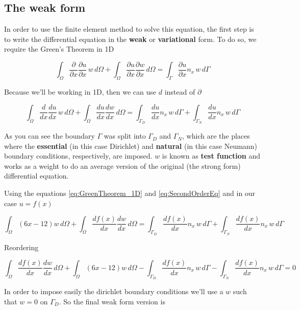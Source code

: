 \documentclass[letterpaper,10pt]{article}
\begin{document}
\subsection{The weak form}

In order to use the finite element method to solve this equation, the first step is to write the differential equation in the \textbf{weak} or \textbf{variational} form. To do so, we require the Green's Theorem in 1D

\[
\int_{\Omega} \frac{\partial}{\partial x} \frac{\partial u}{\partial x} \, w \, d\Omega + \int_{\Omega} \frac{\partial u}{\partial x} \frac{\partial w}{\partial x} \, d\Omega = \int_{\Gamma} \frac{\partial u}{\partial x} n_x \, w \, d\Gamma
\]

Because we'll be working in 1D, then we can use $d$ instead of $\partial$

\begin{equation}
\int_{\Omega} \frac{d}{d x} \frac{d u}{d x} \, w \, d\Omega + \int_{\Omega} \frac{d u}{d x} \frac{d w}{d x} \, d\Omega = \int_{\Gamma_D} \frac{d u}{d x} n_x \, w \, d\Gamma + \int_{\Gamma_N} \frac{d u}{d x} n_x \, w \, d\Gamma
\label{eq:GreenTheorem_1D}
\end{equation}

As you can see the boundary $\Gamma$ was split into $\Gamma_D$ and $\Gamma_N$, which are the places where the \textbf{essential} (in this case Dirichlet) and \textbf{natural} (in this case Neumann) boundary conditions, respectively, are imposed. $w$ is known as \textbf{test function} and works as a weight to do an average version of the original (the strong form) differential equation.

Using the equations \ref{eq:GreenTheorem_1D} and \ref{eq:SecondOrderEq} and in our case $u = f(x)$

\[
\int_{\Omega} (6x-12) w \, d\Omega + \int_{\Omega} \frac{d f(x)}{d x} \frac{d w}{d x} \, d\Omega = \int_{\Gamma_D} \frac{d f(x)}{d x} n_x \, w \, d\Gamma + \int_{\Gamma_N} \frac{d f(x)}{d x} n_x \, w \, d\Gamma
\]

Reordering

\[
\int_{\Omega} \frac{d f(x)}{d x} \frac{d w}{d x} \, d\Omega + \int_{\Omega} (6x-12) w \, d\Omega - \int_{\Gamma_D} \frac{d f(x)}{d x} n_x \, w \, d\Gamma - \int_{\Gamma_N} \frac{d f(x)}{d x} n_x \, w \, d\Gamma = 0
\]

In order to impose easily the dirichlet boundary conditions we'll use a $w$ such that $w=0$ on $\Gamma_D$. So the final weak form version is
\end{document}
